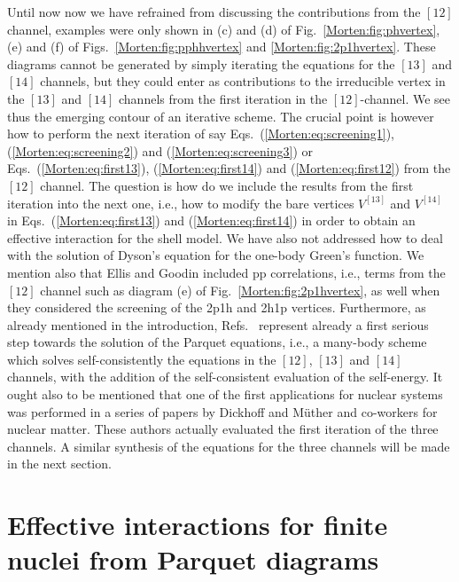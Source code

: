 Until now now we have refrained from discussing the contributions
from the $[12]$ channel, examples were only shown in (c) and (d) of
Fig.~\ref{Morten:fig:phvertex}, (e) and (f) of
Figs.~\ref{Morten:fig:pphhvertex} and \ref{Morten:fig:2p1hvertex}.
These diagrams cannot be generated by simply iterating the equations
for the $[13]$ and $[14]$ channels, but they could enter as
contributions to the irreducible vertex in the $[13]$ and $[14]$
channels from the first iteration in the $[12]$-channel.  We see thus
the emerging contour of an iterative scheme.  The crucial point is
however how to perform the next iteration of say
Eqs.~(\ref{Morten:eq:screening1}), (\ref{Morten:eq:screening2}) and
(\ref{Morten:eq:screening3}) or Eqs.~(\ref{Morten:eq:first13}),
(\ref{Morten:eq:first14}) and (\ref{Morten:eq:first12}) from the
$[12]$ channel. The question is how do we include the results from the
first iteration into the next one, i.e., how to modify the bare
vertices $V^{[13]}$ and $V^{[14]}$ in 
Eqs.~(\ref{Morten:eq:first13}) and (\ref{Morten:eq:first14}) in order
to obtain an effective interaction for the shell model.  We have also
not addressed how to deal with the solution of Dyson's equation for
the one-body Green's function.  
We mention also that Ellis and Goodin
\cite{Morten:eg80} included pp correlations, i.e., terms from the
$[12]$ channel such as diagram (e) of
Fig.~\ref{Morten:fig:2p1hvertex}, as well when they considered the
screening of the 2p1h and 2h1p vertices.  Furthermore, as already
mentioned in the introduction, 
Refs.~
represent already a first serious step towards
the solution of the Parquet equations, i.e., a many-body scheme which
solves self-consistently the equations in the $[12]$, $[13]$ and
$[14]$ channels, with the addition of the self-consistent evaluation
of the self-energy. It ought also to be mentioned that one of the
 first applications for nuclear systems was performed in a
series of papers by Dickhoff and M\"uther and co-workers
\cite{Morten:nuclearmatter}  for nuclear matter. These authors
actually evaluated the first iteration of the three
channels. A similar synthesis of the equations for the 
three channels 
will be made in the next section.

\section{Effective interactions for finite nuclei 
         from Parquet diagrams}
\label{Morten:sec:sec5} 


